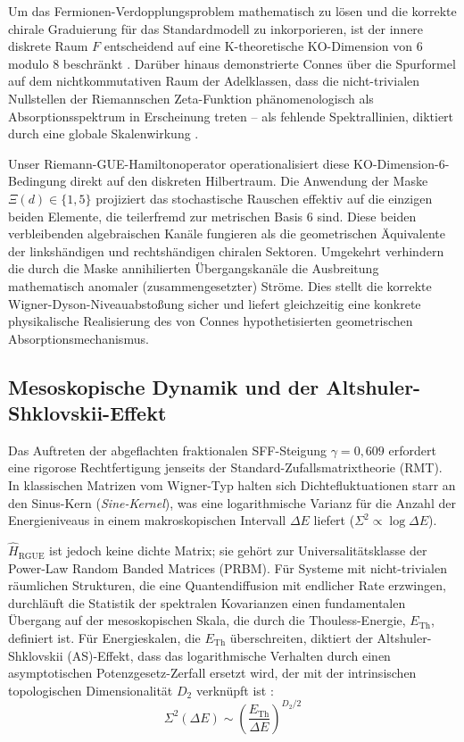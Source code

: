 \documentclass[aps,prl,preprint,superscriptaddress,floatfix]{revtex4-2}
\begin{document}
Um das Fermionen-Verdopplungsproblem mathematisch zu lösen und die korrekte chirale Graduierung für das Standardmodell zu inkorporieren, ist der innere diskrete Raum $F$ entscheidend auf eine K-theoretische KO-Dimension von 6 modulo 8 beschränkt \cite{Connes2008}. Darüber hinaus demonstrierte Connes über die Spurformel auf dem nichtkommutativen Raum der Adelklassen, dass die nicht-trivialen Nullstellen der Riemannschen Zeta-Funktion phänomenologisch als Absorptionsspektrum in Erscheinung treten – als fehlende Spektrallinien, diktiert durch eine globale Skalenwirkung \cite{Connes1999}.

Unser Riemann-GUE-Hamiltonoperator operationalisiert diese KO-Dimension-6-Bedingung direkt auf den diskreten Hilbertraum. Die Anwendung der Maske $\Xi(d) \in \{1,5\}$ projiziert das stochastische Rauschen effektiv auf die einzigen beiden Elemente, die teilerfremd zur metrischen Basis 6 sind. Diese beiden verbleibenden algebraischen Kanäle fungieren als die geometrischen Äquivalente der linkshändigen und rechtshändigen chiralen Sektoren. Umgekehrt verhindern die durch die Maske annihilierten Übergangskanäle die Ausbreitung mathematisch anomaler (zusammengesetzter) Ströme. Dies stellt die korrekte Wigner-Dyson-Niveauabstoßung sicher und liefert gleichzeitig eine konkrete physikalische Realisierung des von Connes hypothetisierten geometrischen Absorptionsmechanismus.

\subsection{Mesoskopische Dynamik und der Altshuler-Shklovskii-Effekt}

Das Auftreten der abgeflachten fraktionalen SFF-Steigung $\gamma = 0,609$ erfordert eine rigorose Rechtfertigung jenseits der Standard-Zufallsmatrixtheorie (RMT). In klassischen Matrizen vom Wigner-Typ halten sich Dichtefluktuationen starr an den Sinus-Kern (\textit{Sine-Kernel}), was eine logarithmische Varianz für die Anzahl der Energieniveaus in einem makroskopischen Intervall $\Delta E$ liefert ($\Sigma^2 \propto \log \Delta E$).

$\hat{H}_{\text{RGUE}}$ ist jedoch keine dichte Matrix; sie gehört zur Universalitätsklasse der Power-Law Random Banded Matrices (PRBM). Für Systeme mit nicht-trivialen räumlichen Strukturen, die eine Quantendiffusion mit endlicher Rate erzwingen, durchläuft die Statistik der spektralen Kovarianzen einen fundamentalen Übergang auf der mesoskopischen Skala, die durch die Thouless-Energie, $E_{\text{Th}}$, definiert ist. Für Energieskalen, die $E_{\text{Th}}$ überschreiten, diktiert der Altshuler-Shklovskii (AS)-Effekt, dass das logarithmische Verhalten durch einen asymptotischen Potenzgesetz-Zerfall ersetzt wird, der mit der intrinsischen topologischen Dimensionalität $D_2$ verknüpft ist \cite{Erdos2013, Erdos2015}:
\begin{equation}
\Sigma^2(\Delta E) \sim \left( \frac{E_{\text{Th}}}{\Delta E} \right)^{D_2/2}
\end{equation}
\end{document}
